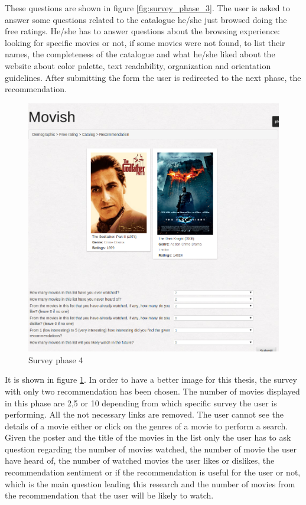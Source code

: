 These questions are shown in figure \ref{fig:survey_phase_3}. The user is asked to answer some questions related to the catalogue he/she just browsed doing the free ratings. He/she has to answer questions about the browsing experience: looking for specific movies or not, if some movies were not found, to list their names, the completeness of the catalogue and what he/she liked about the website about color palette, text readability, organization and orientation guidelines. After submitting the form the user is redirected to the next phase, the recommendation. 

\begin{figure}
  \centering
  \includegraphics[width=\textwidth]{figures/survey_recommendation.png}
  \caption{Survey phase 4}
  \label{fig:survey_phase_4}
\end{figure}

It is shown in figure \ref{fig:survey_phase_4}. In order to have a better image for this thesis, the survey with only two recommendation has been chosen. The number of movies displayed in this phase are 2,5 or 10 depending from which specific survey the user is performing. All the not necessary links are removed. The user cannot see the details of a movie either or click on the genres of a movie to perform a search. Given the poster and the title of the movies in the list only the user has to ask question regarding the number of movies watched, the number of movie the user have heard of, the number of watched movies the user likes or dislikes, the recommendation sentiment or if the recommendation is useful for the user or not, which is the main question leading this research and the number of movies from the recommendation that the user will be likely to watch.  

